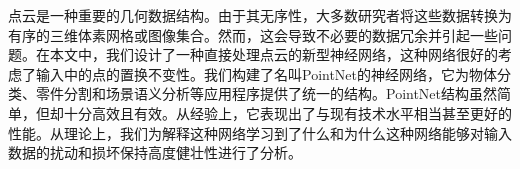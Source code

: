 
点云是一种重要的几何数据结构。由于其无序性，大多数研究者将这些数据转换为有序的三维体素网格或图像集合。然而，这会导致不必要的数据冗余并引起一些问题。在本文中，我们设计了一种直接处理点云的新型神经网络，这种网络很好的考虑了输入中的点的置换不变性。我们构建了名叫PointNet的神经网络，它为物体分类、零件分割和场景语义分析等应用程序提供了统一的结构。PointNet结构虽然简单，但却十分高效且有效。从经验上，它表现出了与现有技术水平相当甚至更好的性能。从理论上，我们为解释这种网络学习到了什么和为什么这种网络能够对输入数据的扰动和损坏保持高度健壮性进行了分析。



   
